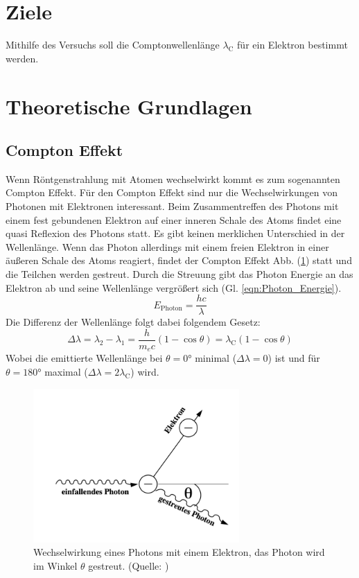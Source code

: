 \section{Ziele}
Mithilfe des Versuchs soll die Comptonwellenlänge $\lambda_{\text{C}}$ für ein Elektron bestimmt werden.

\section{Theoretische Grundlagen}
\label{sec:theorie}

\subsection{Compton Effekt}
Wenn Röntgenstrahlung mit Atomen wechselwirkt kommt es zum sogenannten Compton Effekt.
Für den Compton Effekt sind nur die Wechselwirkungen von Photonen mit Elektronen interessant.
Beim Zusammentreffen des Photons mit einem fest gebundenen Elektron auf einer inneren Schale des Atoms findet eine quasi Reflexion des Photons statt. Es gibt keinen merklichen Unterschied in der Wellenlänge.
Wenn das Photon allerdings mit einem freien Elektron in einer äußeren Schale des Atoms reagiert, findet der Compton Effekt Abb. (\ref{fig:Compton_Effekt}) statt und die Teilchen werden gestreut.
Durch die Streuung gibt das Photon Energie an das Elektron ab und seine Wellenlänge vergrößert sich (Gl. \ref{eqn:Photon_Energie}).
\begin{equation}
    E_{\text{Photon}} = \frac{hc}{\lambda} \label{eqn:Photon_Energie}
\end{equation}
Die Differenz der Wellenlänge folgt dabei folgendem Gesetz:
\begin{equation}
    \Delta \lambda = \lambda_2 - \lambda_1
                    = \frac{h}{m_e c}\left( 1- \cos \theta \right) 
                    = \lambda_{\text{C}} \left( 1- \cos \theta \right) \label{eqn:Compton_Gesetz} 
\end{equation}
Wobei die emittierte Wellenlänge bei $\theta = 0°$ minimal ($\Delta\lambda = 0$) ist und für $\theta = 180°$ maximal ($\Delta\lambda = 2\lambda_{\text{C}}$) wird.
\begin{figure}
    \centering
    \includegraphics[width=0.7\textwidth]{bilder/Compton_Effekt.png}
    \caption{Wechselwirkung eines Photons mit einem Elektron, das Photon wird im Winkel $\theta$ gestreut. (Quelle: \cite{Anleitung})}
    \label{fig:Compton_Effekt}
\end{figure}
